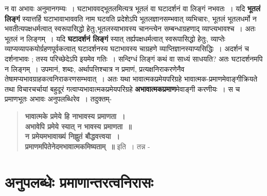 {\begin{verse}
\end{verse}  
न वा अभावः अनुमानगम्यः~। घटाभाववद्भूतलमित्यत्र भूतलं वा घटादर्शनं वा लिङ्गं न\break भवतः~। यदि \textbf{भूतलं लिङ्गं} स्यात्तर्हि घटाभावाभाववति नाम घटवति प्रदेशेऽपि भूतलज्ञान\-सम्भवात् व्यभिचारः, भूतलं भूतलधर्मो न भवतीत्यपक्षधर्मत्वात् स्वरूपासिद्धो हेतुः,\break भूतलस्या\-भावस्य चानन्त्येन सम्बन्धाग्रहणाद् व्याप्त्यभावश्च~। अतः भूतलं न लिङ्गम्~।  यदि \textbf{घटादर्शनं लिङ्गं} स्यात् तर्ह्यपक्षधर्मत्वात् स्वरूपासिद्धो हेतुः, व्याप्तेः व्याप्यव्यापकयोर्ग्रहणपूर्वकत्वात् घटा\-दर्शनस्य घटाभावस्य चाग्रहणे व्याप्तिज्ञानस्याप्यसिद्धिः~। अदर्शनं च दर्शनाभावः ; तस्य परिच्छेदेऽपि इयमेव गतिः~। सन्दिग्धं लिङ्गं कथं वा साध्यं साधयति? अतः घटादर्शनमपि न लिङ्गम्~। उपमानं, शब्दः, अर्थापत्तिश्चात्र न प्रमाणं, प्रत्यक्षनिराकरणेनैव तेषामप्यभावग्राहकत्वनिराकरणसम्भवात्~। अतः यथा भावात्मकप्रमेयपरिग्रहे भावात्मक-प्रमाणमेवाङ्गीक्रियते तथा विचारचर्चायां बहुदूरं गत्वाप्यभावात्मकप्रमेयपरिग्रहे \textbf{अभावात्मकप्रमाण}मेवाङ्गी करणीयः~। स च प्रमाणभूतः अभावः अनुपलब्धिरेव~। तदुक्तम्-
\begin{verse}
\textbf{भावात्मके प्रमेये हि नाभावस्य प्रमाणता~। \\
अभावेपि प्रमेये स्यात् न भावस्य प्रमाणता~॥\\
न प्रमेयमभावाख्यं निह्नुतं बौद्धवत्त्वया~। \\
प्रमाणमपितेनेदमभावात्मकमिष्यताम्~॥} इति~। तन्न -
\end{verse}

\section*{अनुपलब्धेः प्रमाणान्तरत्वनिरासः} 

}
